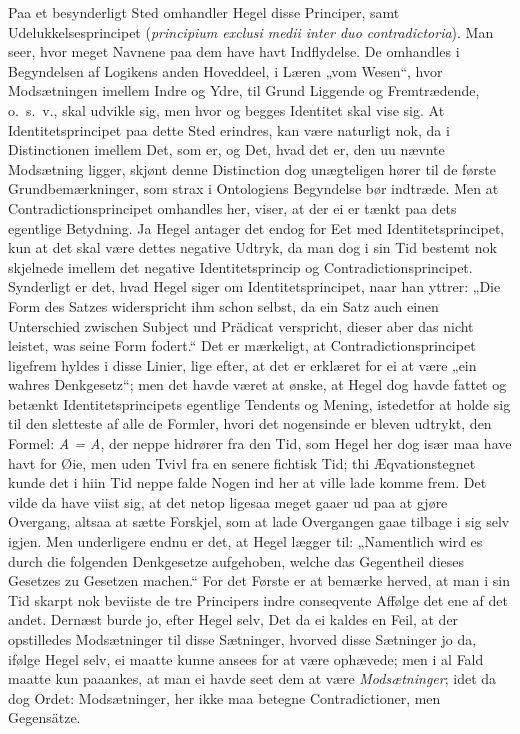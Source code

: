 \documentclass[12pt,a4paper]{book}
\newcommand{\apage}[1]{\marginnote{\footnotesize\textit{[#1]}}}
\begin{document}
Paa et besynderligt Sted omhandler Hegel disse Principer, samt
Udelukkelsesprincipet (\textit{principium exclusi medii inter duo
contradictoria}). Man seer, hvor meget Navnene paa dem have havt
Indflydelse. De omhandles i Begyndelsen af Logikens anden Hoveddeel, i
Læren „vom Wesen“, hvor Modsætningen imellem Indre og Ydre, til Grund
Liggende og Fremtrædende, o.\ s.\ v., skal udvikle sig, men hvor og begges
Identitet skal vise sig. At Identitetsprincipet paa dette Sted erindres,
kan være naturligt nok, da i Distinctionen imellem Det, som er, og Det,
hvad det er, den uu nævnte Modsætning ligger, skjønt denne Distinction dog
unægteligen hører til de første Grundbemærkninger, som strax i Ontologiens
Begyndelse bør indtræde. Men at Contradictionsprincipet omhandles her,
viser, at der ei er tænkt paa dets egentlige Betydning. Ja Hegel antager
det endog for Eet med Identitetsprincipet, kun at det skal være dettes
negative Udtryk, da man dog i sin Tid bestemt nok skjelnede imellem det
negative Identitetsprincip og Contradictionsprincipet. Synderligt er det,
hvad Hegel siger om Identitetsprincipet, naar han yttrer: „Die Form des
Satzes widerspricht ihm schon selbst, da ein Satz auch einen Unterschied
zwischen Subject und Prädicat verspricht, dieser aber das nicht leistet,
was seine Form fodert.“ Det er mærkeligt, at Contradictionsprincipet
ligefrem hyldes i disse Linier, lige efter, at det er erklæret for ei at
være „ein wahres Denkgesetz“; men det havde været at ønske, at Hegel dog
havde fattet og betænkt Identitetsprincipets egentlige Tendents og Mening,
istedetfor at holde sig til den sletteste af alle de Formler, hvori det
nogensinde er bleven udtrykt, den \apage{84} Formel: \textit{A = A}, %
der neppe hidrører fra den Tid, som Hegel her dog især maa have havt for
Øie, men uden Tvivl fra en senere fichtisk Tid; thi Æqvationstegnet kunde
det i hiin Tid neppe falde Nogen ind her at ville lade komme frem. Det
vilde da have viist sig, at det netop ligesaa meget gaaer ud paa at gjøre
Overgang, altsaa at sætte Forskjel, som at lade Overgangen gaae tilbage i
sig selv igjen. Men underligere endnu er det, at Hegel lægger til:
„Namentlich wird es durch die folgenden Denkgesetze aufgehoben, welche das
Gegentheil dieses Gesetzes zu Gesetzen machen.“ For det Første er at
bemærke herved, at man i sin Tid skarpt nok beviiste de tre Principers
indre conseqvente Affølge det ene af det andet. Dernæst burde jo, efter
Hegel selv, Det da ei kaldes en Feil, at der opstilledes Modsætninger til
disse Sætninger, hvorved disse Sætninger jo da, ifølge Hegel selv, ei
maatte kunne ansees for at være ophævede; men i al Fald maatte kun
paaankes, at man ei havde seet dem at være \emph{Modsætninger}; idet da dog Ordet:
Modsætninger, her ikke maa betegne Contradictioner, men Gegensätze.
\end{document}
